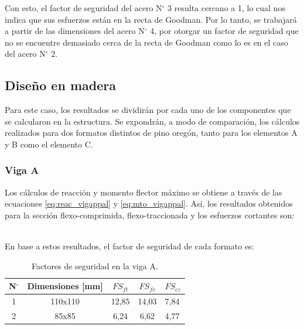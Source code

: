 Con esto, el factor de seguridad del acero N$^{\circ}$ 3 resulta cercano a 1, lo cual nos indica que sus esfuerzos están en la recta de Goodman. Por lo tanto, se trabajará a partir de las dimensiones del acero N$^{\circ}$ 4, por otorgar un factor de seguridad que no se encuentre demasiado cerca de la recta de Goodman como lo es en el caso del acero N$^{\circ}$ 2. 

\subsection{Diseño en madera}
Para este caso, los resultados se dividirán por cada uno de los componentes que se calcularon en la estructura. Se expondrán, a modo de comparación, los cálculos realizados para dos formatos distintos de pino oregón, tanto para los elementos A y B como el elemento C.

\subsubsection{Viga A} Los cálculos de reacción y momento flector máximo se obtiene a través de las ecuaciones \ref{eq:reac_vigappal} y \ref{eq:mto_vigappal}. Así, los resultados obtenidos para la sección flexo-comprimida, flexo-traccionada y los esfuerzos cortantes son:
\begin{table}[h]
\centering
{}
\caption{Resultados obtenidos para la flexión y cizalle de la viga A.}
\label{tab:res_viga_a1}
\end{table}
\\
En base a estos resultados, el factor de seguridad de cada formato es:

\begin{table}[H]
\centering
\begin{tabular}{@{}ccccl@{}}
\toprule
N$^{\circ}$ & Dimensiones [mm] & $FS_{ft}$ & $FS_{fv}$ & $FS_{cz}$ \\ \midrule
1 & 110x110 & 12,85 & 14,03 & 7,84 \\
2 & 85x85 & 6,24 & 6,62 & 4,77 \\ \bottomrule
\end{tabular}
\caption{Factores de seguridad en la viga A.}
\label{tab:res_viga_a2}
\end{table}

